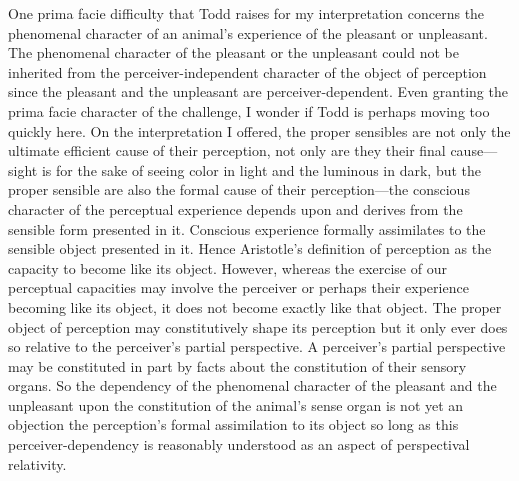 \documentclass[12pt]{article}
\begin{document}
One prima facie difficulty that Todd raises for my interpretation concerns the phenomenal character of an animal's experience of the pleasant or unpleasant. The phenomenal character of the pleasant or the unpleasant could not be inherited from the perceiver-independent character of the object of perception since the pleasant and the unpleasant are perceiver-dependent. Even granting the prima facie character of the challenge, I wonder if Todd is perhaps moving too quickly here. On the interpretation I offered, the proper sensibles are not only the ultimate efficient cause of their perception, not only are they their final cause---sight is for the sake of seeing color in light and the luminous in dark, but the proper sensible are also the formal cause of their perception---the conscious character of the perceptual experience depends upon and derives from the sensible form presented in it. Conscious experience formally assimilates to the sensible object presented in it. Hence Aristotle's definition of perception as the capacity to become like its object. However, whereas the exercise of our perceptual capacities may involve the perceiver or perhaps their experience becoming like its object, it does not become exactly like that object. The proper object of perception may constitutively shape its perception but it only ever does so relative to the perceiver's partial perspective. A perceiver's partial perspective may be constituted in part by facts about the constitution of their sensory organs. So the dependency of the phenomenal character of the pleasant and the unpleasant upon the constitution of the animal's sense organ is not yet an objection the perception's formal assimilation to its object so long as this perceiver-dependency is reasonably understood as an aspect of perspectival relativity.
\end{document}
